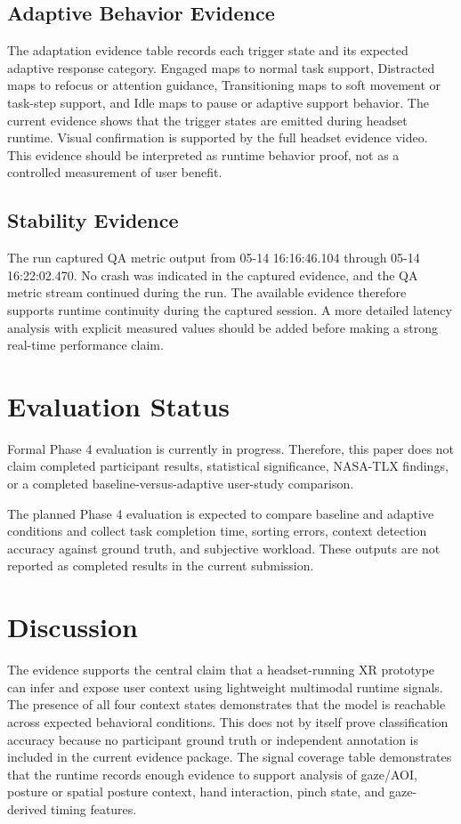 \documentclass[conference]{IEEEtran}
\begin{document}
\subsection{Adaptive Behavior Evidence}
The adaptation evidence table records each trigger state and its expected adaptive response category. Engaged maps to normal task support, Distracted maps to refocus or attention guidance, Transitioning maps to soft movement or task-step support, and Idle maps to pause or adaptive support behavior. The current evidence shows that the trigger states are emitted during headset runtime. Visual confirmation is supported by the full headset evidence video. This evidence should be interpreted as runtime behavior proof, not as a controlled measurement of user benefit.

\subsection{Stability Evidence}
The run captured QA metric output from 05-14 16:16:46.104 through 05-14 16:22:02.470. No crash was indicated in the captured evidence, and the QA metric stream continued during the run. The available evidence therefore supports runtime continuity during the captured session. A more detailed latency analysis with explicit measured values should be added before making a strong real-time performance claim.

\section{Evaluation Status}
Formal Phase 4 evaluation is currently in progress. Therefore, this paper does not claim completed participant results, statistical significance, NASA-TLX findings, or a completed baseline-versus-adaptive user-study comparison.

The planned Phase 4 evaluation is expected to compare baseline and adaptive conditions and collect task completion time, sorting errors, context detection accuracy against ground truth, and subjective workload. These outputs are not reported as completed results in the current submission.

\section{Discussion}
The evidence supports the central claim that a headset-running XR prototype can infer and expose user context using lightweight multimodal runtime signals. The presence of all four context states demonstrates that the model is reachable across expected behavioral conditions. This does not by itself prove classification accuracy because no participant ground truth or independent annotation is included in the current evidence package. The signal coverage table demonstrates that the runtime records enough evidence to support analysis of gaze/AOI, posture or spatial posture context, hand interaction, pinch state, and gaze-derived timing features.
\end{document}
